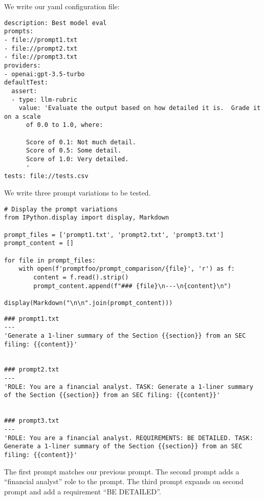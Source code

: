 We write our yaml configuration file:

\begin{verbatim}
description: Best model eval
prompts:
- file://prompt1.txt
- file://prompt2.txt
- file://prompt3.txt
providers:
- openai:gpt-3.5-turbo
defaultTest:
  assert:
  - type: llm-rubric
    value: 'Evaluate the output based on how detailed it is.  Grade it on a scale
      of 0.0 to 1.0, where:

      Score of 0.1: Not much detail.
      Score of 0.5: Some detail.
      Score of 1.0: Very detailed.
      '
tests: file://tests.csv
\end{verbatim}
    

We write three prompt variations to be tested.
\begin{verbatim}
# Display the prompt variations
from IPython.display import display, Markdown

prompt_files = ['prompt1.txt', 'prompt2.txt', 'prompt3.txt']
prompt_content = []

for file in prompt_files:
    with open(f'promptfoo/prompt_comparison/{file}', 'r') as f:
        content = f.read().strip()
        prompt_content.append(f"### {file}\n---\n{content}\n")

display(Markdown("\n\n".join(prompt_content)))
\end{verbatim}

\begin{verbatim}
### prompt1.txt
---
'Generate a 1-liner summary of the Section {{section}} from an SEC filing: {{content}}'


### prompt2.txt
---
'ROLE: You are a financial analyst. TASK: Generate a 1-liner summary of the Section {{section}} from an SEC filing: {{content}}'


### prompt3.txt
---
'ROLE: You are a financial analyst. REQUIREMENTS: BE DETAILED. TASK: Generate a 1-liner summary of the Section {{section}} from an SEC filing: {{content}}'
\end{verbatim}


The first prompt matches our previous prompt. The second prompt adds a ``financial analyst'' role to the prompt. The third prompt expands on second prompt and add a requirement ``BE DETAILED''.

